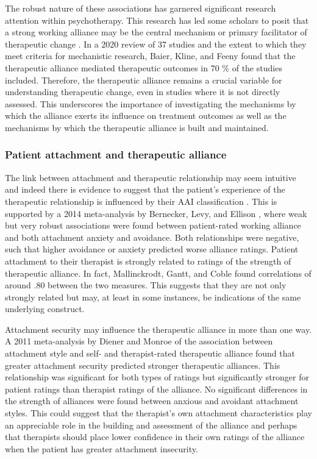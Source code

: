 \documentclass[12pt]{report}
\begin{document}
The robust nature of these associations has garnered significant research attention within psychotherapy. This research has led some scholars to posit that a strong working alliance may be the central mechanism or primary facilitator of therapeutic change \cite{RodgersCailholBuiEtAl2010}.
In a 2020 review of 37 studies and the extent to which they meet criteria for mechanistic research, Baier, Kline, and Feeny \citeyear{Baier2020} found that the therapeutic alliance mediated therapeutic outcomes in 70 \% of the studies included.
Therefore, the therapeutic alliance remains a crucial variable for understanding therapeutic change, even in studies where it is not directly assessed.  This underscores the importance of investigating the mechanisms by which the alliance exerts its influence on treatment outcomes as well as the mechanisms by which the therapeutic alliance is built and maintained.

\subsubsection*{Patient attachment and therapeutic alliance}
The link between attachment and therapeutic relationship may seem intuitive and indeed there is evidence to suggest that the patient's experience of the therapeutic relationship is influenced by their AAI classification \cite{Talia2019}.
This is supported by a 2014 meta-analysis by Bernecker, Levy, and Ellison \citeyear{Bernecker2014}, where weak but very robust associations were found between patient-rated working alliance and both attachment anxiety and avoidance. Both relationships were negative, such that higher avoidance or anxiety predicted worse alliance ratings.
Patient attachment to their therapist is strongly related to ratings of the strength of therapeutic alliance. In fact, Mallinckrodt, Gantt, and Coble \citeyear{Mallinckrodt1995} found correlations of around .80 between the two measures. This suggests that they are not only strongly related but may, at least in some instances, be indications of the same underlying construct.

Attachment security may influence the therapeutic alliance in more than one way.
A 2011 meta-analysis by Diener and Monroe \citeyear{Diener2011} of the association between attachment style and self- and therapist-rated therapeutic alliance found that greater attachment security predicted stronger therapeutic alliances. This relationship was significant for both types of ratings but significantly stronger for patient ratings than therapist ratings of the alliance.
No significant differences in the strength of alliances were found between anxious and avoidant attachment styles.
This could suggest that the therapist's own attachment characteristics play an appreciable role in the building and assessment of the alliance and perhaps that therapists should place lower confidence in their own ratings of the alliance when the patient has greater attachment insecurity.
\end{document}
